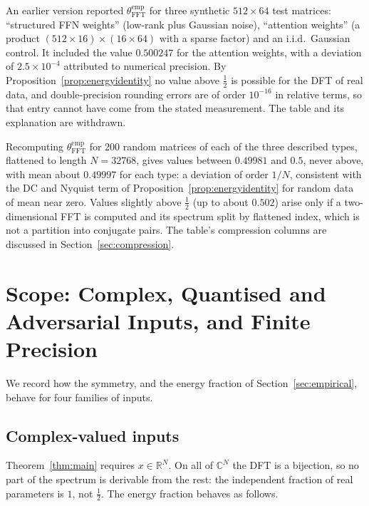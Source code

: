 \documentclass[12pt]{article}
\theoremstyle{definition}
\newcommand{\R}{\mathbb{R}}
\newcommand{\C}{\mathbb{C}}
\newcommand{\thetaFFT}{\theta_{\mathrm{FFT}}}
\begin{document}
An earlier version reported $\thetaFFT^{\mathrm{emp}}$ for three synthetic
$512 \times 64$ test matrices: ``structured FFN weights'' (low-rank plus
Gaussian noise), ``attention weights'' (a product
$(512 \times 16) \times (16 \times 64)$ with a sparse factor) and an
i.i.d.\ Gaussian control.  It included the value $0.500247$ for the
attention weights, with a deviation of $2.5 \times 10^{-4}$ attributed to
numerical precision.  By Proposition~\ref{prop:energyidentity} no value
above $\tfrac{1}{2}$ is possible for the DFT of real data, and
double-precision rounding errors are of order $10^{-16}$ in relative
terms, so that entry cannot have come from the stated measurement.  The
table and its explanation are withdrawn.

Recomputing $\thetaFFT^{\mathrm{emp}}$ for 200 random matrices of each of
the three described types, flattened to length $N = 32768$, gives values
between $0.49981$ and $0.5$, never above, with mean about $0.49997$ for
each type: a deviation of order $1/N$, consistent with the DC and Nyquist
term of Proposition~\ref{prop:energyidentity} for random data of mean
near zero.  Values slightly above $\tfrac{1}{2}$ (up to about $0.502$)
arise only if a two-dimensional FFT is computed and its spectrum split by
flattened index, which is not a partition into conjugate pairs.  The
table's compression columns are discussed in
Section~\ref{sec:compression}.

\section{Scope: Complex, Quantised and Adversarial Inputs, and Finite Precision}
\label{sec:stress}

We record how the symmetry, and the energy fraction of
Section~\ref{sec:empirical}, behave for four families of inputs.

\subsection{Complex-valued inputs}

Theorem~\ref{thm:main} requires $x \in \R^N$.  On all of $\C^N$ the DFT
is a bijection, so no part of the spectrum is derivable from the rest:
the independent fraction of real parameters is $1$, not $\tfrac{1}{2}$.
The energy fraction behaves as follows.
\end{document}
